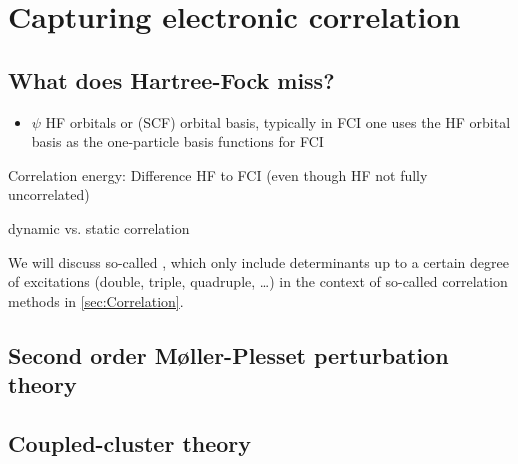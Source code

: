 \section{Capturing electronic correlation}
\label{sec:Correlation}

\subsection{What does Hartree-Fock miss?}







\begin{itemize}
\item
$\psi$ HF orbitals or (SCF) orbital basis,
typically in FCI one uses the HF orbital basis as the one-particle basis functions for FCI
	\end{itemize}



Correlation energy: Difference HF to FCI
(even though HF not fully uncorrelated)

dynamic vs. static correlation


We will discuss so-called ,
which only include determinants up to a certain
degree of excitations (double, triple, quadruple, \ldots)
in the context of so-called correlation methods in \vref{sec:Correlation}.


\subsection{Second order Møller-Plesset perturbation theory}

\subsection{Coupled-cluster theory}
\label{sec:CC}

